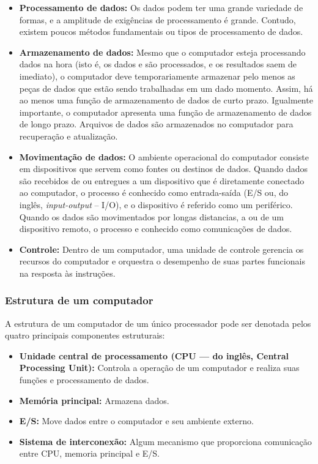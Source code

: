 \documentclass{article}
\begin{document}
\begin{itemize}
    \item \textbf{Processamento de dados:} Os dados podem ter uma grande
        variedade de formas, e a amplitude de exigências de processamento é
        grande. Contudo, existem poucos métodos fundamentais ou tipos de
        processamento de dados.
    \item \textbf{Armazenamento de dados:} Mesmo que o computador esteja
        processando dados na hora (isto é, os dados e são processados, e os
        resultados saem de imediato), o computador deve temporariamente
        armazenar pelo menos as peças de dados que estão sendo trabalhadas em
        um dado momento. Assim, há ao menos uma função de armazenamento de
        dados de curto prazo. Igualmente importante, o computador apresenta uma
        função de armazenamento de dados de longo prazo. Arquivos de dados são
        armazenados no computador para recuperação e atualização.
    \item \textbf{Movimentação de dados:} O ambiente operacional do computador
        consiste em dispositivos que servem como fontes ou destinos de dados.
        Quando dados são recebidos de ou entregues a um dispositivo que é
        diretamente conectado ao computador, o processo é conhecido como
        entrada-saída (E/S ou, do inglês, \textit{input-output} -- I/O), e o
        dispositivo é referido como um periférico. Quando os dados são
        movimentados por longas distancias, a ou de um dispositivo remoto, o
        processo e conhecido como comunicações de dados.
    \item \textbf{Controle:} Dentro de um computador, uma unidade de controle
        gerencia os recursos do computador e orquestra o desempenho de suas
        partes funcionais na resposta às instruções.
\end{itemize}

\subsubsection{Estrutura de um computador}
A estrutura de um computador de um único processador pode ser denotada pelos
quatro principais componentes estruturais:
\begin{itemize}
    \item \textbf{Unidade central de processamento (CPU — do inglês, Central
        Processing Unit):} Controla a operação de um computador e realiza suas
        funções e processamento de dados.
    \item \textbf{Memória principal:} Armazena dados.
    \item \textbf{E/S:} Move dados entre o computador e seu ambiente externo.
    \item \textbf{Sistema de interconexão:} Algum mecanismo que proporciona
        comunicação entre CPU, memoria principal e E/S.
\end{itemize}
\end{document}
